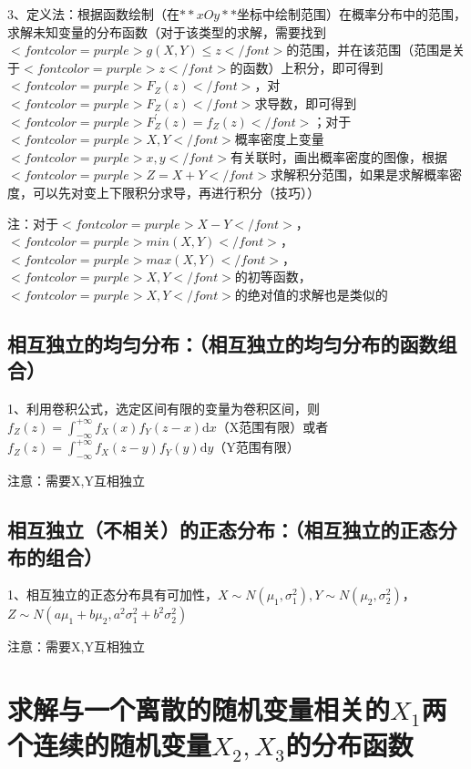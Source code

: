 3、定义法：根据函数绘制（在$ **xOy** $坐标中绘制范围）在概率分布中的范围，求解未知变量的分布函数（对于该类型的求解，需要找到$ <font color=purple>g(X, Y) \leqslant z</font> $的范围，并在该范围（范围是关于$ <font color=purple>z</font> $的函数）上积分，即可得到$ <font color=purple>F_{Z}(z)</font> $，对$ <font color=purple>F_{Z}(z)</font> $求导数，即可得到$ <font color=purple>F_{Z}^{'}(z)=f_{Z}(z)</font> $；对于$ <font color=purple>X,Y</font> $概率密度上变量$ <font color=purple>x,y</font> $有关联时，画出概率密度的图像，根据$ <font color=purple>Z=X+Y</font> $求解积分范围，如果是求解概率密度，可以先对变上下限积分求导，再进行积分（技巧））

注：对于$ <font color=purple>X-Y</font> $，$ <font color=purple>min(X,Y)</font> $，$ <font color=purple>max(X,Y)</font> $，$ <font color=purple>X,Y</font> $的初等函数，$ <font color=purple>X,Y</font> $的绝对值的求解也是类似的



\subsection{相互独立的均匀分布：（相互独立的均匀分布的函数组合）}

1、利用卷积公式，选定区间有限的变量为卷积区间，则$ f_{Z}(z)=\int_{-\infty}^{+\infty} f_{X}(x) f_{Y}(z-x) \mathrm{d} x $（X范围有限）或者$ f_{Z}(z)=\int_{-\infty}^{+\infty} f_{X}(z-y) f_{Y}(y) \mathrm{d} y $（Y范围有限）

注意：需要X,Y互相独立



\subsection{相互独立（不相关）的正态分布：（相互独立的正态分布的组合）}

1、相互独立的正态分布具有可加性，$ X \sim{N}\left(\mu_{1}, \sigma_{1}^{2}\right), Y \sim N\left(\mu_{2}, \sigma_{2}^{2}\right) $，$ Z \sim N\left(a\mu_{1}+b\mu_{2}, a^2\sigma_{1}^{2}+b^2\sigma_{2}^{2}\right) $

注意：需要X,Y互相独立

\section{求解与一个离散的随机变量相关的$ X_1 $两个连续的随机变量$ X_2,X_3 $的分布函数}

